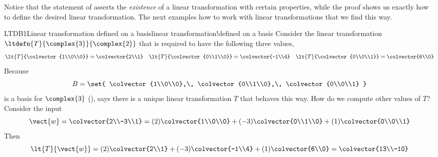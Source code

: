 %
Notice that the statement of  asserts the {\em existence} of a linear transformation with certain properties, while the proof shows us exactly how to define the desired linear transformation.  The next examples how to work with linear transformations that we find this way.
%
\begin{example}{LTDB1}{Linear transformation defined on a basis}{linear transformation!defined on a basis}
Consider the linear transformation $\ltdefn{T}{\complex{3}}{\complex{2}}$ that is required to have the following three values,
%
\begin{align*}
\lt{T}{\colvector{1\\0\\0}}=\colvector{2\\1}&&
\lt{T}{\colvector{0\\1\\0}}=\colvector{-1\\4}&&
\lt{T}{\colvector{0\\0\\1}}=\colvector{6\\0}
\end{align*}
%
Because 
%
\begin{equation*}
B=\set{
\colvector{1\\0\\0},\,
\colvector{0\\1\\0},\,
\colvector{0\\0\\1}
}
\end{equation*}
%
is a basis for $\complex{3}$ (),  says there is a unique linear transformation $T$ that behaves this way.  How do we compute other values of $T$?  Consider the input
%
\begin{equation*}
\vect{w}=\colvector{2\\-3\\1}=(2)\colvector{1\\0\\0}+(-3)\colvector{0\\1\\0}+(1)\colvector{0\\0\\1}
\end{equation*}
%
Then
%
\begin{equation*}
\lt{T}{\vect{w}}=(2)\colvector{2\\1}+ (-3)\colvector{-1\\4}+ (1)\colvector{6\\0}=\colvector{13\\-10}

\end{equation*}
\end{example}
